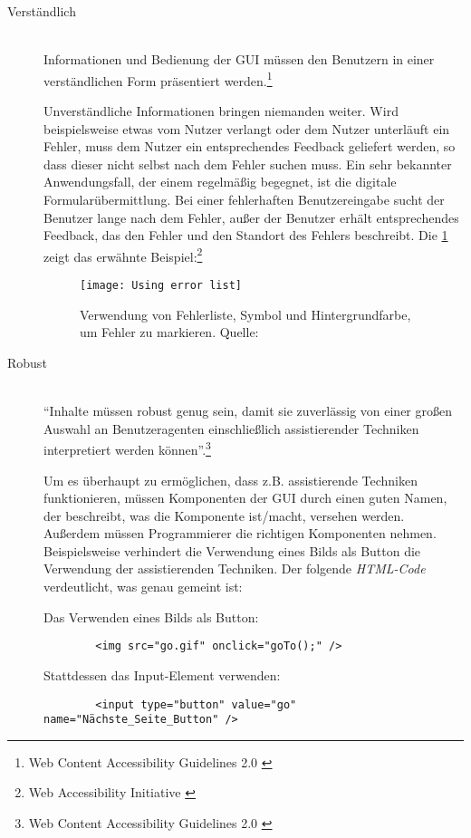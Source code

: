 \begin{description}
	\item [Verständlich]\hfill \\
	Informationen und Bedienung der \ac{GUI} müssen den Benutzern in einer verständlichen Form präsentiert 
	werden.\footnote{Web Content Accessibility Guidelines 2.0 \cite{WCAG2.0}}
	
	Unverständliche Informationen bringen niemanden weiter. Wird beispielsweise etwas vom Nutzer verlangt oder dem Nutzer unterläuft ein Fehler, muss dem Nutzer ein entsprechendes 
	Feedback geliefert werden, so dass dieser nicht selbst nach dem Fehler suchen muss. Ein sehr bekannter Anwendungsfall, der einem regelmäßig begegnet, 
	ist die digitale Formularübermittlung. Bei einer fehlerhaften Benutzereingabe sucht der Benutzer lange nach dem Fehler, außer der Benutzer erhält entsprechendes 
	Feedback, das den Fehler und den Standort des Fehlers beschreibt. Die \cref{fig:Using error list} zeigt das erwähnte Beispiel:\footnote{Web Accessibility Initiative \cite{WAI}}
	
	\begin{figure}[H]
		\centering
		\texttt{[image: Using error list]}
		\caption[Verwendung von Fehlerliste, Symbol und Hintergrundfarbe, um Fehler zu markieren]{Verwendung von Fehlerliste, Symbol
		 und Hintergrundfarbe, um Fehler zu markieren. Quelle: \cite{WAI}}
		\label{fig:Using error list}
	\end{figure}
	
	\item [Robust]\hfill \\
	"`Inhalte müssen robust genug sein, damit sie zuverlässig von einer großen Auswahl an Benutzeragenten einschließlich assistierender Techniken 
	interpretiert werden können"'.\footnote{Web Content Accessibility Guidelines 2.0 \cite{WCAG2.0}}
	
	Um es überhaupt zu ermöglichen, dass z.B. assistierende Techniken funktionieren, müssen Komponenten der \ac{GUI} durch einen guten Namen, der beschreibt, was die Komponente
	ist/macht, versehen werden. Außerdem müssen Programmierer die richtigen Komponenten nehmen. Beispielsweise verhindert die Verwendung eines Bilds als Button die Verwendung 
	der assistierenden Techniken. Der folgende \textit{HTML-Code} verdeutlicht, was genau gemeint ist:
	
	Das Verwenden eines Bilds als Button:
	
	{\color{blue}
	\begin{verbatim}
		<img src="go.gif" onclick="goTo();" />
	\end{verbatim}}
	
	Stattdessen das Input-Element verwenden:
	
	{\color{blue}
	\begin{verbatim}
		<input type="button" value="go" name="Nächste_Seite_Button" />
	\end{verbatim}}
	
\end{description}

